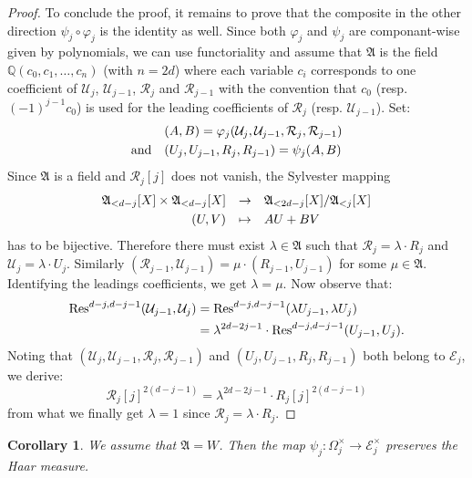 \documentclass{jT}
\numberwithin{equation}{section}
\newtheorem{cor}[theo]{Corollary}
\theoremstyle{definition}
\newcommand{\Q}{\mathbb Q}
\newcommand{\ring}{\mathfrak A}
\renewcommand{\Res}{\text{\rm Res}}
\newcommand{\A}{W}
\begin{document}
\begin{proof}
To conclude the proof, it remains to prove that the composite in 
the other direction $\psi_j \circ \varphi_j$ is the identity as well. 
Since both $\varphi_j$ and $\psi_j$ are componant-wise given by 
polynomials, we can use functoriality and assume that $\ring$ is 
the field $\Q(c_0, c_1, \ldots, c_n)$ (with $n = 2d$) where
each variable $c_i$ corresponds to one coefficient of $\mathcal U_j$, 
$\mathcal U_{j-1}$, $\mathcal R_j$ and $\mathcal R_{j-1}$ with the
convention that $c_0$ (resp. $(-1)^{j-1} c_0$) is used for the leading
coefficients of $\mathcal R_j$ (resp. $\mathcal U_{j-1}$). Set:
$$\begin{array}{ll}
& (A,B) = \varphi_j(\mathcal U_j, \mathcal U_{j-1}, 
\mathcal R_j, \mathcal R_{j-1}) \smallskip \\
\text{and} & (U_j, U_{j-1}, R_j, R_{j-1}) = \psi_j(A,B)
\end{array}$$
Since $\ring$ is a field and $\mathcal R_j[j]$ does not vanish, the 
Sylvester mapping
$$\begin{array}{rcl}
\ring_{<d-j}[X] \times \ring_{<d-j}[X] & \to & 
\ring_{<2d-j}[X]/\ring_{<j}[X] \smallskip \\
(U,V) & \mapsto & AU + BV
\end{array}$$
has to be bijective. Therefore there must exist $\lambda \in \ring$ 
such that $\mathcal R_j = \lambda \cdot R_j$ and $\mathcal U_j = \lambda 
\cdot U_j$. Similarly $(\mathcal R_{j-1}, \mathcal U_{j-1}) = \mu \cdot
(R_{j-1}, U_{j-1})$ for some $\mu \in \ring$. Identifying the leadings 
coefficients, we get $\lambda = \mu$. Now observe that:
\begin{align*}
\Res^{d-j,d-j-1}(\mathcal U_{j-1}, \mathcal U_j) & = 
\Res^{d-j,d-j-1}(\lambda U_{j-1}, \lambda U_j) \\
& = \lambda^{2d-2j-1} \cdot \Res^{d-j,d-j-1}(U_{j-1}, U_j).
\end{align*}
Noting that $(\mathcal U_j, \mathcal U_{j-1}, \mathcal R_j, \mathcal 
R_{j-1})$ and $(U_j, U_{j-1}, R_j, R_{j-1})$ both belong to $\mathcal
E_j$, we derive:
$$\mathcal R_j[j]^{2(d-j-1)} = \lambda^{2d-2j-1} \cdot R_j[j]^{2(d-j-1)}$$
from what we finally get $\lambda = 1$ since $\mathcal R_j = \lambda
\cdot R_j$.
\end{proof}

\begin{cor}
\label{cor:bijection}
We assume that $\ring = \A$. Then the map $\psi_j : \Omega_j^\times
\to \mathcal E_j^\times$ preserves the Haar measure.
\end{cor}
\end{document}

